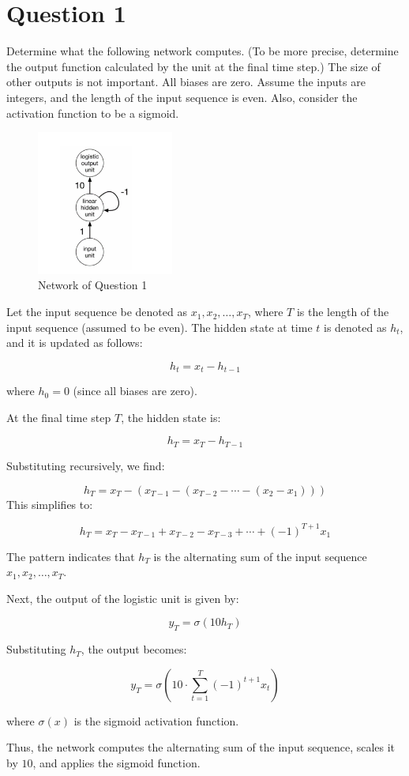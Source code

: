 \section{Question 1}

Determine what the following network computes. (To be more precise, determine the output function calculated by the unit at the final time step.) The size of other outputs is not important. All biases are zero. Assume the inputs are integers, and the length of the input sequence is even. Also, consider the activation function to be a sigmoid.

\begin{figure}[H]
    \centering
    \includegraphics[width = 0.4\textwidth]{Q1.png}
    \caption{Network of Question 1}
\end{figure}
\begin{qsolve}
    \begin{qsolve}[]
Let the input sequence be denoted as \( x_1, x_2, \dots, x_T \), where \( T \) is the length of the input sequence (assumed to be even). The hidden state at time \( t \) is denoted as \( h_t \), and it is updated as follows:

\[
h_t = x_t - h_{t-1}
\]

where \( h_0 = 0 \) (since all biases are zero).

At the final time step \( T \), the hidden state is:

\[
h_T = x_T - h_{T-1}
\]

Substituting recursively, we find:

\[
h_T = x_T - (x_{T-1} - (x_{T-2} - \cdots - (x_2 - x_1)))
\]
\splitqsolve[\splitqsolve]
This simplifies to:

\[
h_T = x_T - x_{T-1} + x_{T-2} - x_{T-3} + \cdots + (-1)^{T+1} x_1
\]

The pattern indicates that \( h_T \) is the alternating sum of the input sequence \( x_1, x_2, \dots, x_T \).

Next, the output of the logistic unit is given by:

\[
y_T = \sigma(10h_T)
\]

Substituting \( h_T \), the output becomes:

\[
y_T = \sigma\left(10 \cdot \sum_{t=1}^T (-1)^{t+1} x_t\right)
\]

where \( \sigma(x) \) is the sigmoid activation function.

Thus, the network computes the alternating sum of the input sequence, scales it by \( 10 \), and applies the sigmoid function.

    \end{qsolve}
\end{qsolve}